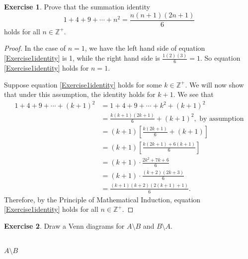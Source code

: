 \documentclass[11pt]{article}
\theoremstyle{plain}
\theoremstyle{definition}
\newtheorem{exercise}{Exercise}
\newcommand{\Zplus}{\mathbb{Z^+}}
\begin{document}
\begin{exercise} Prove that the summation identity \begin{equation}\label{Exercise1identity}1+4+9+\cdots+n^2 = \displaystyle\frac{n(n+1)(2n+1)}{6}\end{equation} holds for all $n \in \Zplus$.
\end{exercise}

\vspace{2ex}

\begin{proof}
In the case of $n = 1$, we have the left hand side of equation \eqref{Exercise1identity} is 1, while the right hand side is $\displaystyle\frac{1(2)(3)}{6} = 1$.  So equation \eqref{Exercise1identity} holds for $n = 1$.  
    
Suppose equation \eqref{Exercise1identity} holds for some $k \in \Zplus$.  We will now show that under this assumption, the identity holds for $k+1$.  We see that
    $$\begin{aligned}
    1 + 4 + 9 + \cdots + (k+1)^2 &= 1 + 4 + 9 + \cdots + k^2 + (k+1)^2\\
    &= \frac{k(k+1)(2k+1)}{6} + (k+1)^2, \text{ by assumption}\\
    &= (k+1)\left[\frac{k(2k+1)}{6} + (k+1)\right]\\
    &= (k+1)\left[\frac{k(2k+1)+6(k+1)}{6}\right]\\
    &= (k+1)\cdot\frac{2k^2+7k+6}{6}\\
    &= (k+1)\cdot\frac{(k+2)(2k+3)}{6}\\
    &= \frac{(k+1)(k+2)(2(k+1)+1)}{6}.
    \end{aligned}$$  Therefore, by the Principle of Mathematical Induction, equation \eqref{Exercise1identity} holds for all $n \in \Zplus$.
\end{proof}

\newpage

\begin{exercise}
Draw a Venn diagrams for $A\setminus B$ and $B\setminus A$.
\end{exercise}

\vspace{2ex}

\begin{center}
\\
	$A\setminus B$
\end{center}
\end{document}
